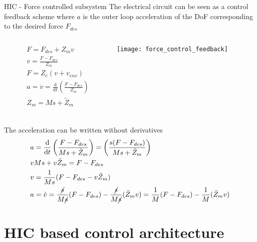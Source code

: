 \begin{frame}[shrink=30]{HIC - Force controlled subsystem}
  The electrical circuit \alert{can be seen as a control feedback scheme where $a$ is the outer loop
  acceleration} of the DoF corresponding to the desired force $F_{des}$
  \begin{columns}
    \begin{column}{0.4\textwidth}
      \begin{align*}
        &F = F_{des} + Z_m v\\
        &v = \frac{F - F_{des}}{Z_m}\\
        &F = Z_e(v + v_{env})\\
        &a = \dot{v} = \frac{\mathrm{d}}{\mathrm{d}t} \left(\frac{F - F_{des}}{Z_m} \right)\\
        &Z_m = M s + \tilde{Z}_m\\
      \end{align*}
    \end{column}
    \begin{column}{0.5\textwidth}
      \centering
      \texttt{[image: force\_control\_feedback]}
    \end{column}
  \end{columns}
  The acceleration can be written \alert{without derivatives}
  \begin{align*}
    &a = \frac{\mathrm{d}}{\mathrm{d}t} \left(\frac{F - F_{des}}{Ms + \tilde{Z}_m} \right) = \left(\frac{s(F - F_{des})}{Ms + \tilde{Z}_m} \right)\\
    &vMs + v \tilde{Z}_m = F - F_{des}\\
    &v = \frac{1}{Ms} (F - F_{des} - v \tilde{Z}_m )\\
    &a = \dot{v} = \frac{\cancel{s}}{M\cancel{s}} (F - F_{des}) - \frac{\cancel{s}}{M\cancel{s}}( \tilde{Z}_m v) = \frac{1}{M} (F - F_{des}) - \frac{1}{M}( \tilde{Z}_m v)
  \end{align*}
\end{frame}

\section{HIC based control architecture}

